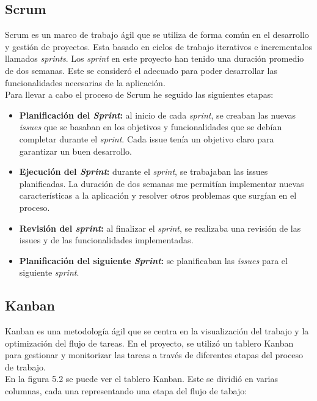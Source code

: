 \subsection{Scrum}
Scrum es un marco de trabajo ágil que se utiliza de forma común en el desarrollo y gestión de proyectos. Esta basado en ciclos de trabajo iterativos e incrementalos llamados \textit{sprints}. Los \textit{sprint} en este proyecto han tenido una duración promedio de dos semanas. Este se consideró el adecuado para poder desarrollar las funcionalidades necesarias de la aplicación. \\
Para llevar a cabo el proceso de Scrum he seguido las siguientes etapas:
\begin{itemize}
    \item \textbf{Planificación del \textit{Sprint}:} al inicio de cada \textit{sprint}, se creaban las nuevas \textit{issues} que se basaban en los objetivos y funcionalidades que se debían completar durante el \textit{sprint}. Cada issue tenía un objetivo claro para garantizar un buen desarrollo. 
    \item \textbf{Ejecución del \textit{Sprint}:} durante el \textit{sprint}, se trabajaban las issues planificadas. La duración de dos semanas me permitían implementar nuevas características a la aplicación y resolver otros problemas que surgían en el proceso.
    \item \textbf{Revisión del \textit{sprint}:} al finalizar el \textit{sprint}, se realizaba una revisión de las issues y de las funcionalidades implementadas. 
    \item \textbf{Planificación del siguiente \textit{Sprint}:} se planificaban las \textit{issues} para el siguiente \textit{sprint}.
\end{itemize}

\subsection{Kanban}
Kanban es una metodología ágil que se centra en la visualización del trabajo y la optimización del flujo de tareas. En el proyecto, se utilizó un tablero Kanban para gestionar y monitorizar las tareas a través de diferentes etapas del proceso de trabajo. \\
En la figura 5.2 se puede ver el tablero Kanban. Este se dividió en varias columnas, cada una representando una etapa del flujo de tabajo:

